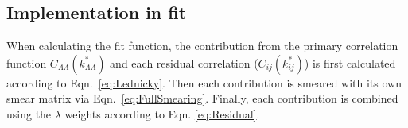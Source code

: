 \subsection{Implementation in fit}

When calculating the fit function, the contribution from the primary correlation function $C_{\Lambda\Lambda}(k^*_{\Lambda\Lambda})$ and each residual correlation  ($C_{ij}(k^*_{ij})$) is first calculated according to Eqn.\ \ref{eq:Lednicky}.
Then each contribution is smeared with its own smear matrix via Eqn.\ \ref{eq:FullSmearing}.
Finally, each contribution is combined using the $\lambda$ weights according to Eqn. \ref{eq:Residual}.

 
